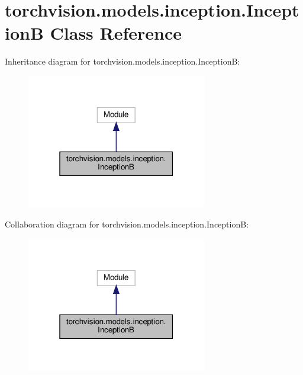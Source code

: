 \hypertarget{classtorchvision_1_1models_1_1inception_1_1InceptionB}{}\section{torchvision.\+models.\+inception.\+InceptionB Class Reference}
\label{classtorchvision_1_1models_1_1inception_1_1InceptionB}


Inheritance diagram for torchvision.\+models.\+inception.\+InceptionB\+:
\nopagebreak
\begin{figure}[H]
\begin{center}
\leavevmode
\includegraphics[width=223pt]{classtorchvision_1_1models_1_1inception_1_1InceptionB__inherit__graph}
\end{center}
\end{figure}


Collaboration diagram for torchvision.\+models.\+inception.\+InceptionB\+:
\nopagebreak
\begin{figure}[H]
\begin{center}
\leavevmode
\includegraphics[width=223pt]{classtorchvision_1_1models_1_1inception_1_1InceptionB__coll__graph}
\end{center}
\end{figure}
